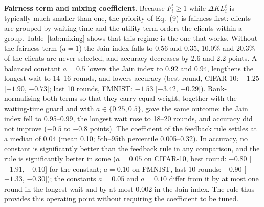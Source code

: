 \documentclass[pdflatex,sn-mathphys-num,oneside]{sn-jnl}%
\theoremstyle{thmstyleone}%
\theoremstyle{thmstyletwo}%
\theoremstyle{thmstylethree}%
\begin{document}
\textbf{Fairness term and mixing coefficient.} Because $F_i^t\ge 1$ while $\Delta KL_i^t$ is typically much smaller than one, the priority of Eq.~(9) is fairness-first: clients are grouped by waiting time and the utility term orders the clients within a group. Table~\ref{tab:mixing} shows that this regime is the one that works. Without the fairness term ($a=1$) the Jain index falls to 0.56 and 0.35, 10.0\% and 20.3\% of the clients are never selected, and accuracy decreases by 2.6 and 2.2 points. A balanced constant $a=0.5$ lowers the Jain index to 0.92 and 0.94, lengthens the longest wait to 14--16 rounds, and lowers accuracy (best round, CIFAR-10: $-1.25$ [$-1.90$, $-0.73$]; last 10 rounds, FMNIST: $-1.53$ [$-3.42$, $-0.29$]). Rank-normalising both terms so that they carry equal weight, together with the waiting-time guard and with $a\in\{0.25,0.5\}$, gave the same outcome: the Jain index fell to 0.95--0.99, the longest wait rose to 18--20 rounds, and accuracy did not improve ($-0.5$ to $-0.8$ points). The coefficient of the feedback rule settles at a median of 0.04 (mean 0.10; 5th--95th percentile 0.005--0.32). In accuracy, no constant is significantly better than the feedback rule in any comparison, and the rule is significantly better in some ($a=0.05$ on CIFAR-10, best round: $-0.80$ [$-1.91$, $-0.10$] for the constant; $a=0.10$ on FMNIST, last 10 rounds: $-0.90$ [$-1.33$, $-0.30$]); the constants $a=0.05$ and $a=0.10$ differ from it by at most one round in the longest wait and by at most 0.002 in the Jain index. The rule thus provides this operating point without requiring the coefficient to be tuned.
\end{document}
